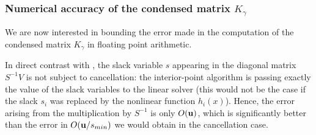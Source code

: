 \subsubsection{Numerical accuracy of the condensed matrix $K_\gamma$}
We are now interested in bounding the error made in
the computation of the condensed matrix $K_\gamma$ in floating
point arithmetic.

In direct contrast with \cite[Section 4.1]{wright1998ill}, the slack variable
$s$ appearing in the diagonal matrix $S^{-1} V$ is not subject to cancellation:
the interior-point algorithm is passing exactly the value of the slack
variables to the linear solver (this would not be the case if the slack
$s_i$ was replaced by the nonlinear function $h_i(x)$). Hence,
the error arising from the multiplication by $S^{-1}$ is only $O(\mathbf{u})$,
which is significantly better than the error in $O(\mathbf{u} / s_{min})$ we would obtain
in the cancellation case.

